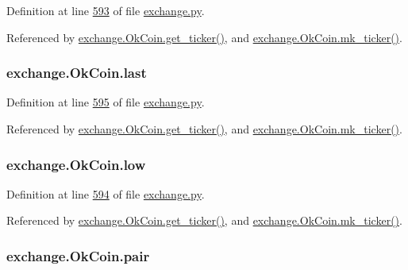 Definition at line \hyperlink{exchange_8py_source_l00593}{593} of file \hyperlink{exchange_8py_source}{exchange.\+py}.



Referenced by \hyperlink{exchange_8py_source_l00600}{exchange.\+Ok\+Coin.\+get\+\_\+ticker()}, and \hyperlink{exchange_8py_source_l00614}{exchange.\+Ok\+Coin.\+mk\+\_\+ticker()}.

\subsubsection[{\texorpdfstring{last}{last}}]{\setlength{\rightskip}{0pt plus 5cm}exchange.\+Ok\+Coin.\+last}\hypertarget{classexchange_1_1_ok_coin_a726afbe3a75835fdcbe523aed8d6763c}{}\label{classexchange_1_1_ok_coin_a726afbe3a75835fdcbe523aed8d6763c}


Definition at line \hyperlink{exchange_8py_source_l00595}{595} of file \hyperlink{exchange_8py_source}{exchange.\+py}.



Referenced by \hyperlink{exchange_8py_source_l00600}{exchange.\+Ok\+Coin.\+get\+\_\+ticker()}, and \hyperlink{exchange_8py_source_l00614}{exchange.\+Ok\+Coin.\+mk\+\_\+ticker()}.

\subsubsection[{\texorpdfstring{low}{low}}]{\setlength{\rightskip}{0pt plus 5cm}exchange.\+Ok\+Coin.\+low}\hypertarget{classexchange_1_1_ok_coin_a1afa53e0ad63830d0585288abea42094}{}\label{classexchange_1_1_ok_coin_a1afa53e0ad63830d0585288abea42094}


Definition at line \hyperlink{exchange_8py_source_l00594}{594} of file \hyperlink{exchange_8py_source}{exchange.\+py}.



Referenced by \hyperlink{exchange_8py_source_l00600}{exchange.\+Ok\+Coin.\+get\+\_\+ticker()}, and \hyperlink{exchange_8py_source_l00614}{exchange.\+Ok\+Coin.\+mk\+\_\+ticker()}.

\subsubsection[{\texorpdfstring{pair}{pair}}]{\setlength{\rightskip}{0pt plus 5cm}exchange.\+Ok\+Coin.\+pair}\hypertarget{classexchange_1_1_ok_coin_a52f3b919f86565518d46c49c5b8f66a6}{}\label{classexchange_1_1_ok_coin_a52f3b919f86565518d46c49c5b8f66a6}


